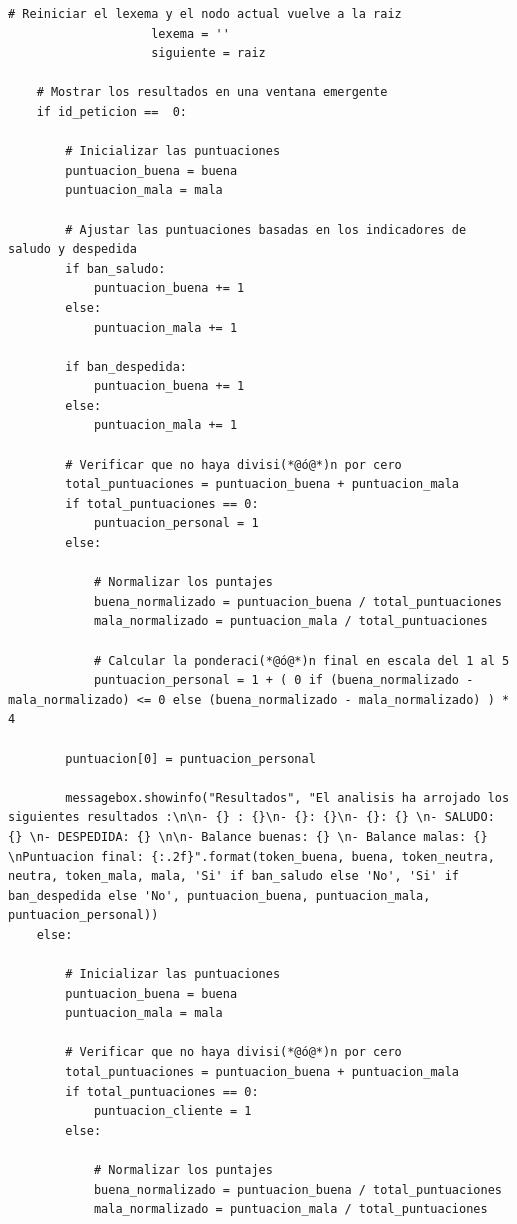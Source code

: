 \documentclass[10pt,times,twocolumn]{article}
\begin{document}
\begin{lstlisting}[caption={Core del análisis. Procesar}, xleftmargin=0.05\textwidth]
                    # Reiniciar el lexema y el nodo actual vuelve a la raiz
                    lexema = ''
                    siguiente = raiz
    
    # Mostrar los resultados en una ventana emergente
    if id_peticion ==  0:

        # Inicializar las puntuaciones
        puntuacion_buena = buena
        puntuacion_mala = mala

        # Ajustar las puntuaciones basadas en los indicadores de saludo y despedida
        if ban_saludo:
            puntuacion_buena += 1
        else:
            puntuacion_mala += 1
            
        if ban_despedida:
            puntuacion_buena += 1
        else:
            puntuacion_mala += 1

        # Verificar que no haya divisi(*@ó@*)n por cero
        total_puntuaciones = puntuacion_buena + puntuacion_mala
        if total_puntuaciones == 0:
            puntuacion_personal = 1
        else:

            # Normalizar los puntajes
            buena_normalizado = puntuacion_buena / total_puntuaciones
            mala_normalizado = puntuacion_mala / total_puntuaciones

            # Calcular la ponderaci(*@ó@*)n final en escala del 1 al 5
            puntuacion_personal = 1 + ( 0 if (buena_normalizado - mala_normalizado) <= 0 else (buena_normalizado - mala_normalizado) ) * 4

        puntuacion[0] = puntuacion_personal

        messagebox.showinfo("Resultados", "El analisis ha arrojado los siguientes resultados :\n\n- {} : {}\n- {}: {}\n- {}: {} \n- SALUDO: {} \n- DESPEDIDA: {} \n\n- Balance buenas: {} \n- Balance malas: {} \nPuntuacion final: {:.2f}".format(token_buena, buena, token_neutra, neutra, token_mala, mala, 'Si' if ban_saludo else 'No', 'Si' if ban_despedida else 'No', puntuacion_buena, puntuacion_mala, puntuacion_personal))
    else:
    
        # Inicializar las puntuaciones
        puntuacion_buena = buena
        puntuacion_mala = mala

        # Verificar que no haya divisi(*@ó@*)n por cero
        total_puntuaciones = puntuacion_buena + puntuacion_mala
        if total_puntuaciones == 0:
            puntuacion_cliente = 1
        else:

            # Normalizar los puntajes
            buena_normalizado = puntuacion_buena / total_puntuaciones
            mala_normalizado = puntuacion_mala / total_puntuaciones


\end{lstlisting}
\end{document}
